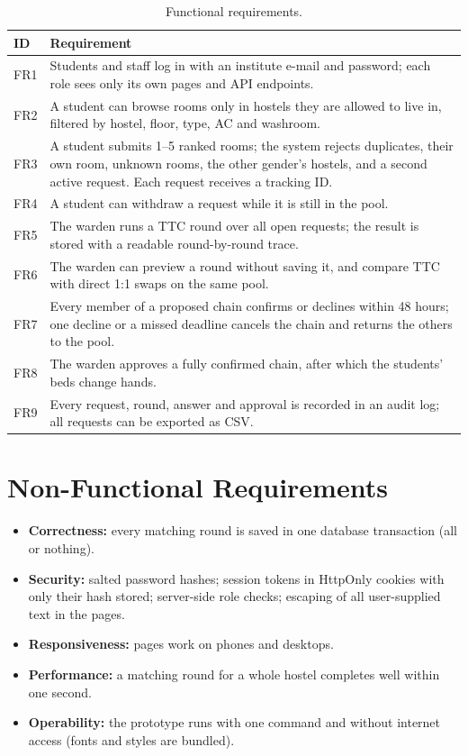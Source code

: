 \documentclass{tietreport}
\begin{document}
\begin{table}[H]
\centering
\begin{tabularx}{\textwidth}{@{}lL@{}}
\toprule
\textbf{ID} & \textbf{Requirement} \\
\midrule
FR1 & Students and staff log in with an institute e-mail and password; each role sees only its own pages and API endpoints. \\
FR2 & A student can browse rooms only in hostels they are allowed to live in, filtered by hostel, floor, type, AC and washroom. \\
FR3 & A student submits 1--5 ranked rooms; the system rejects duplicates, their own room, unknown rooms, the other gender's hostels, and a second active request. Each request receives a tracking ID. \\
FR4 & A student can withdraw a request while it is still in the pool. \\
FR5 & The warden runs a TTC round over all open requests; the result is stored with a readable round-by-round trace. \\
FR6 & The warden can preview a round without saving it, and compare TTC with direct 1:1 swaps on the same pool. \\
FR7 & Every member of a proposed chain confirms or declines within 48 hours; one decline or a missed deadline cancels the chain and returns the others to the pool. \\
FR8 & The warden approves a fully confirmed chain, after which the students' beds change hands. \\
FR9 & Every request, round, answer and approval is recorded in an audit log; all requests can be exported as CSV. \\
\bottomrule
\end{tabularx}
\caption{Functional requirements.}
\end{table}

\section{Non-Functional Requirements}

\begin{itemize}
  \item \textbf{Correctness:} every matching round is saved in one
    database transaction (all or nothing).
  \item \textbf{Security:} salted password hashes; session tokens in
    HttpOnly cookies with only their hash stored; server-side role
    checks; escaping of all user-supplied text in the pages.
  \item \textbf{Responsiveness:} pages work on phones and desktops.
  \item \textbf{Performance:} a matching round for a whole hostel
    completes well within one second.
  \item \textbf{Operability:} the prototype runs with one command and
    without internet access (fonts and styles are bundled).
\end{itemize}
\end{document}
